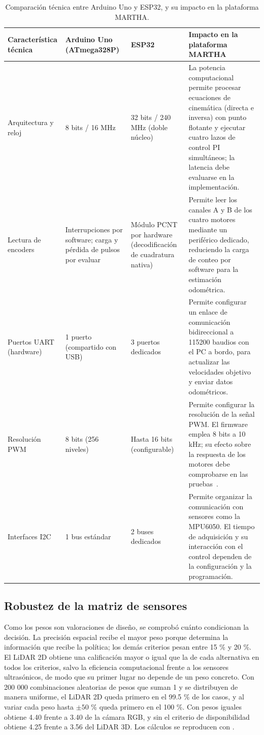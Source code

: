 \begin{table}[htbp]
\centering
\footnotesize
\setlength{\tabcolsep}{4pt}
\begin{tabular}{@{}p{2.6cm}p{3.3cm}p{3.6cm}p{4.4cm}@{}}
\toprule
\textbf{Característica técnica} & \textbf{Arduino Uno (ATmega328P)} & \textbf{ESP32} & \textbf{Impacto en la plataforma MARTHA} \\
\midrule
Arquitectura y reloj & 8 bits / 16 MHz & 32 bits / 240 MHz (doble núcleo) & La potencia computacional permite procesar ecuaciones de cinemática (directa e inversa) con punto flotante y ejecutar cuatro lazos de control PI simultáneos; la latencia debe evaluarse en la implementación. \\
Lectura de encoders & Interrupciones por software; carga y pérdida de pulsos por evaluar & Módulo PCNT por hardware (decodificación de cuadratura nativa) & Permite leer los canales A y B de los cuatro motores mediante un periférico dedicado, reduciendo la carga de conteo por software para la estimación odométrica. \\
Puertos UART (hardware) & 1 puerto (compartido con USB) & 3 puertos dedicados & Permite configurar un enlace de comunicación bidireccional a 115200 baudios con el PC a bordo, para actualizar las velocidades objetivo y enviar datos odométricos. \\
Resolución PWM & 8 bits (256 niveles) & Hasta 16 bits (configurable) & Permite configurar la resolución de la señal PWM. El firmware emplea 8 bits a 10 kHz; su efecto sobre la respuesta de los motores debe comprobarse en las pruebas~\cite{repoMartha}. \\
Interfaces I2C & 1 bus estándar & 2 buses dedicados & Permite organizar la comunicación con sensores como la MPU6050. El tiempo de adquisición y su interacción con el control dependen de la configuración y la programación. \\
\bottomrule
\end{tabular}
\caption{Comparación técnica entre Arduino Uno y ESP32, y su impacto en la plataforma MARTHA.}
\label{tab:arduino_esp32}
\end{table}

\subsection{Robustez de la matriz de sensores}

Como los pesos son valoraciones de diseño, se comprobó cuánto condicionan la decisión. La precisión espacial recibe el mayor peso porque determina la información que recibe la política; los demás criterios pesan entre 15 \% y 20 \%. El LiDAR 2D obtiene una calificación mayor o igual que la de cada alternativa en todos los criterios, salvo la eficiencia computacional frente a los sensores ultrasónicos, de modo que su primer lugar no depende de un peso concreto. Con 200 000 combinaciones aleatorias de pesos que suman 1 y se distribuyen de manera uniforme, el LiDAR 2D queda primero en el 99.5 \% de los casos, y al variar cada peso hasta $\pm50$ \% queda primero en el 100 \%. Con pesos iguales obtiene 4.40 frente a 3.40 de la cámara RGB, y sin el criterio de disponibilidad obtiene 4.25 frente a 3.56 del LiDAR 3D. Los cálculos se reproducen con .
